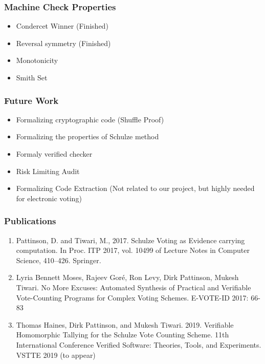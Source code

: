 \documentclass{beamer}
\begin{document}
\begin{frame}
\frametitle{Machine Check Properties}
\begin{itemize}
\item Condercet Winner (Finished)
\item Reversal symmetry (Finished)
\item Monotonicity
\item Smith Set
\end{itemize}
\end{frame}

\begin{frame}
\frametitle{Future Work}
\begin{itemize}
\item Formalizing cryptographic code (Shuffle Proof)
\item Formalizing the properties of Schulze method
\item Formaly verified checker 
\item Risk Limiting Audit 
\item Formalizing Code Extraction (Not related to our project, but highly needed for electronic voting)
\end{itemize}
\end{frame}

\begin{frame}
\frametitle{Publications}
\begin{enumerate}
	\item Pattinson, D. and Tiwari, M., 2017. Schulze Voting as Evidence carrying computation. In Proc. 
	ITP 2017, vol. 10499 of Lecture Notes in Computer Science, 410–426. Springer. 
	\item Lyria Bennett Moses, Rajeev Goré, Ron Levy, Dirk Pattinson, Mukesh Tiwari.
	No More Excuses: Automated Synthesis of Practical and Verifiable Vote-Counting Programs for Complex 
	Voting 	Schemes. E-VOTE-ID 2017: 66-83
	\item Thomas Haines, Dirk Pattinson, and Mukesh Tiwari. 2019. 
	  Verifiable Homomorphic Tallying for the Schulze Vote Counting Scheme. 
	  11th International Conference Verified Software: Theories, Tools, and Experiments. 
      VSTTE 2019 (to appear)	
	\end{enumerate}
\end{frame}
\end{document}
